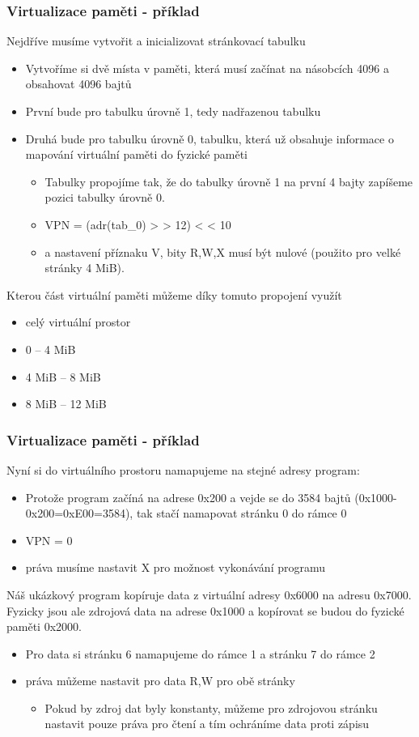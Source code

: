 \documentclass{beamer}
\begin{document}
\begin{frame}
\frametitle{Virtualizace paměti - příklad}

Nejdříve musíme vytvořit a inicializovat stránkovací tabulku
\begin{itemize}
\item Vytvoříme si dvě místa v paměti, která musí začínat na násobcích 4096 a obsahovat 4096 bajtů
\item První bude pro tabulku úrovně 1, tedy nadřazenou tabulku
\item Druhá bude pro tabulku úrovně 0, tabulku, která už obsahuje informace o mapování virtuální paměti do fyzické paměti
\begin{itemize}
\item Tabulky propojíme tak, že do tabulky úrovně 1 na první 4 bajty zapíšeme pozici tabulky úrovně 0.
\item VPN = (adr(tab\_0) > > 12) < < 10
\item a nastavení příznaku V, bity R,W,X musí být nulové (použito pro velké stránky 4 MiB).
\end{itemize}
\end{itemize}

Kterou část virtuální paměti můžeme díky tomuto propojení využít
\begin{itemize}
 \item[A] celý virtuální prostor
 \item[B] 0 -- 4 MiB
 \item[C] 4 MiB -- 8 MiB
 \item[D] 8 MiB -- 12 MiB
\end{itemize}
\end{frame}


\begin{frame}
\frametitle{Virtualizace paměti - příklad}

Nyní si do virtuálního prostoru namapujeme na stejné adresy program:
\begin{itemize}
\item Protože program začíná na adrese 0x200 a vejde se do 3584 bajtů (0x1000-0x200=0xE00=3584), tak stačí namapovat stránku 0 do rámce 0
\item VPN = 0
\item práva musíme nastavit X pro možnost vykonávání programu
\end{itemize}

Náš ukázkový program kopíruje data z virtuální adresy 0x6000 na adresu 0x7000. Fyzicky jsou ale zdrojová data na adrese 0x1000 a kopírovat se budou do fyzické paměti 0x2000.
\begin{itemize}
\item Pro data si stránku 6 namapujeme do rámce 1 a stránku 7 do rámce 2
\item práva můžeme nastavit pro data R,W pro obě stránky
\begin{itemize}
\item Pokud by zdroj dat byly konstanty, můžeme pro zdrojovou stránku nastavit pouze práva pro čtení a tím ochráníme data proti zápisu
\end{itemize}
\end{itemize}

\end{frame}
\end{document}
